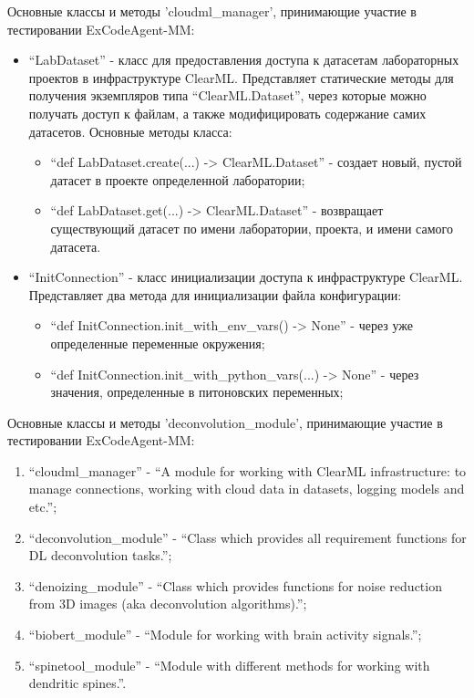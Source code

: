 Основные классы и методы 'cloudml\_manager', принимающие участие в тестировании ExCodeAgent-MM:
\begin{itemize}
	\item ``LabDataset'' - класс для предоставления доступа к датасетам лабораторных проектов в 
инфраструктуре ClearML. Представляет статические методы для получения экземпляров типа 
``ClearML.Dataset'', через которые можно получать доступ к файлам, а также модифицировать содержание
самих датасетов. Основные методы класса:
	\begin{itemize}
		\item ``def LabDataset.create(...) -> ClearML.Dataset'' - создает новый, пустой датасет в проекте
определенной лаборатории;
		\item ``def LabDataset.get(...) -> ClearML.Dataset'' - возвращает существующий датасет по
имени лаборатории, проекта, и имени самого датасета.
	\end{itemize}

	\item ``InitConnection'' - класс инициализации доступа к инфраструктуре ClearML. Представляет
два метода для инициализации файла конфигурации:
	\begin{itemize}
		\item ``def InitConnection.init\_with\_env\_vars() -> None'' - через уже определенные переменные 
окружения;
	\item ``def InitConnection.init\_with\_python\_vars(...) -> None'' - через значения, определенные
в питоновских переменных;
	\end{itemize}
\end{itemize}

Основные классы и методы 'deconvolution\_module', принимающие участие в тестировании ExCodeAgent-MM:
\begin{enumerate}
	\item ``cloudml\_manager'' - ``A module for working with ClearML infrastructure: 
to manage connections, working with cloud data in datasets, logging models and etc.'';
	\item ``deconvolution\_module'' - ``Class which provides all requirement functions for DL deconvolution tasks.'';
	\item ``denoizing\_module'' - ``Class which provides functions for noise reduction from 3D images 
(aka deconvolution algorithms).'';
	\item ``biobert\_module'' - ``Module for working with brain activity signals.'';
	\item ``spinetool\_module'' - ``Module with different methods for working with dendritic spines.''.
\end{enumerate}

